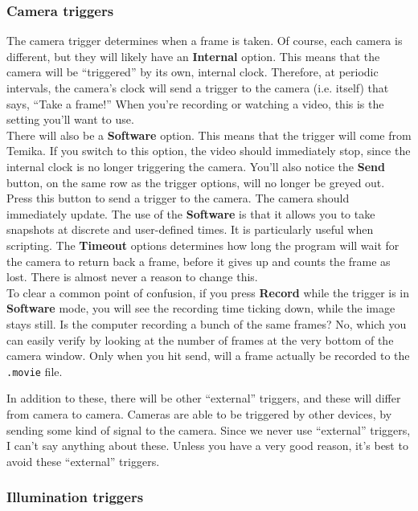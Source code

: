 \documentclass{article}
\begin{document}
\subsubsection{Camera triggers}

The camera trigger determines when a frame is taken. Of course, each camera is different, but they will likely have an \textbf{Internal} option. This means that the camera will be ``triggered'' by its own, internal clock. Therefore, at periodic intervals, the camera's clock will send a trigger to the camera (i.e. itself) that says, ``Take a frame!'' When you're recording or watching a video, this is the setting you'll want to use.\\

There will also be a \textbf{Software} option. This means that the trigger will come from Temika. If you switch to this option, the video should immediately stop, since the internal clock is no longer triggering the camera. You'll also notice the \textbf{Send} button, on the same row as the trigger options, will no longer be greyed out. Press this button to send a trigger to the camera. The camera should immediately update. The use of the \textbf{Software} is that it allows you to take snapshots at discrete and user-defined times. It is particularly useful when scripting. The \textbf{Timeout} options determines how long the program will wait for the camera to return back a frame, before it gives up and counts the frame as lost. There is almost never a reason to change this.\\

To clear a common point of confusion, if you press \textbf{Record} while the trigger is in \textbf{Software} mode, you will see the recording time ticking down, while the image stays still. Is the computer recording a bunch of the same frames? No, which you can easily verify by looking at the number of frames at the very bottom of the camera window. Only when you hit send, will a frame actually be recorded to the \verb|.movie| file.

In addition to these, there will be other ``external'' triggers, and these will differ from camera to camera. Cameras are able to be triggered by other devices, by sending some kind of signal to the camera. Since we never use ``external'' triggers, I can't say anything about these. Unless you have a very good reason, it's best to avoid these ``external'' triggers.\\

\subsubsection{Illumination triggers}
\end{document}
